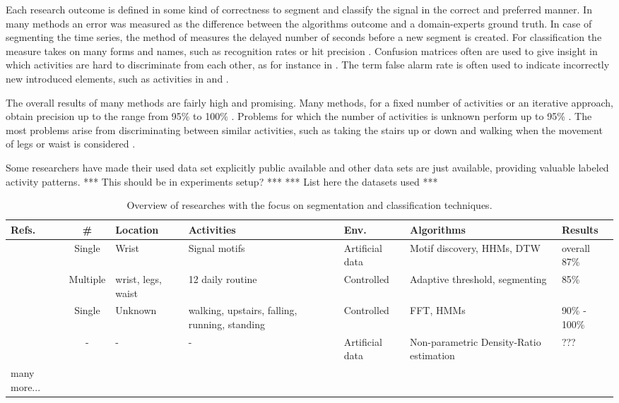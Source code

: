 Each research outcome is defined in some kind of correctness to segment and classify the signal in the correct and preferred manner.
In many methods an error was measured as the difference between the algorithms outcome and a domain-experts ground truth.
In case of segmenting the time series, the method of \cite{guenterberg2009automatic} measures the delayed number of seconds before a new segment is created.
For classification the measure takes on many forms and names, such as recognition rates \cite{bao2004activity} or hit precision \cite{ahmed2012non}.
Confusion matrices often are used to give insight in which activities are hard to discriminate from each other, as for instance in \cite{kwapisz2011activity}.
The term false alarm rate is often used to indicate incorrectly new introduced elements, such as activities in \cite{ahmed2012non} and \cite{kawahara2009change}.

The overall results of many methods are fairly high and promising.
Many methods, for a fixed number of activities or an iterative approach, obtain precision up to the range from 95\% to 100\% \cite{minnen2006discovering, shi2009towards, kwapisz2011activity, duque2012offline, he2009activity, lee2178physical, siirtola2012recognizing}.
Problems for which the number of activities is unknown perform up to 95\% \cite{ahmed2012non, barbivc2004segmenting}.
The most problems arise from discriminating between similar activities, such as taking the stairs up or down and walking when the movement of legs or waist is considered \cite{kwapisz2011activity, duque2012offline}.

Some researchers have made their used data set explicitly public available and other data sets are just available, providing valuable labeled activity patterns. *** This should be in experiments setup? ***
*** List here the datasets used ***

\begin{table}
\tiny
\centering
\begin{tabular}{ | l | c | p{1.5cm} | p{1.5cm} | p{1.5cm} | p{2.5cm} | p{3cm} | }
  \hline
  Refs. & \# & Location & Activities & Env. & Algorithms & Results \\
  \hline
  \cite{minnen2006discovering} & Single & Wrist & Signal motifs & Artificial data & Motif discovery, HHMs, DTW & overall 87\% \\
  \hline
  \cite{guenterberg2009automatic} & Multiple & wrist, legs, waist & 12 daily routine & Controlled & Adaptive threshold, segmenting & 85\% \\
  \hline
  \cite{shi2009towards} & Single & Unknown & walking, upstairs, falling, running, standing & Controlled & FFT, HMMs & 90\% - 100\% \\
  \hline
  \cite{kawahara2009change} & - & - & - & Artificial data & Non-parametric Density-Ratio estimation & ??? \\
  \hline
  many more... & & & & & & \\
  \hline
\end{tabular}
\caption{Overview of researches with the focus on segmentation and classification techniques.}
\label{table:papers_segmentation_classification}
\end{table}

